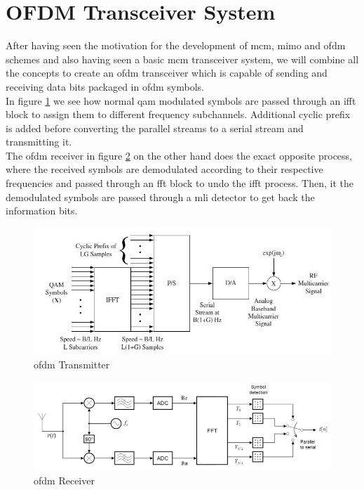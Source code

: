 \section{OFDM Transceiver System}
After having seen the motivation for the development of \acrshort{mcm}, \acrshort{mimo} and \acrshort{ofdm} schemes and also having seen a basic \acrshort{mcm} transceiver system, we will combine all the concepts to create an \acrshort{ofdm} transceiver which is capable of sending and receiving data bits packaged in \acrshort{ofdm} symbols.\\
In figure \ref{fig:ofdm transmitter} we see how normal \acrshort{qam} modulated symbols are passed through an \acrshort{ifft} block to assign them to different frequency subchannels. Additional cyclic prefix is added before converting the parallel streams to a serial stream and transmitting it.\\
The \acrshort{ofdm} receiver in figure \ref{fig:ofdm receiver} on the other hand does the exact opposite process, where the received symbols are demodulated according to their respective frequencies and passed through an \acrshort{fft} block to undo the \acrshort{ifft} process. Then, it the demodulated symbols are passed through a \acrlong{mli} detector to get back the information bits.\\

\begin{figure}[!htbp]
\centering
\includegraphics[scale=1]{Chapter 2/Figures/OFDM Transmitter}
\caption{\acrshort{ofdm} Transmitter}
\label{fig:ofdm transmitter}
\end{figure}

\begin{figure}[!htbp]
\centering
\includegraphics[scale=0.6]{Chapter 2/Figures/OFDM Receiver}
\caption{\acrshort{ofdm} Receiver}
\label{fig:ofdm receiver}
\end{figure}


